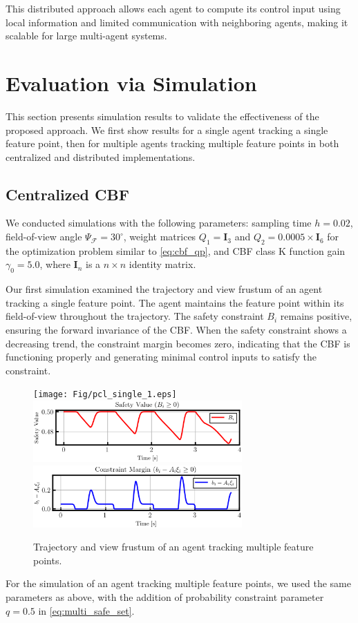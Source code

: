 \documentclass[fleqn,10pt,twocolumn]{SICE_FES25}
\theoremstyle{definition}
\theoremstyle{plain}
\begin{document}
This distributed approach allows each agent to compute its control input using local information and limited communication with neighboring agents, making it scalable for large multi-agent systems.

\section{Evaluation via Simulation}

This section presents simulation results to validate the effectiveness of the proposed approach. We first show results for a single agent tracking a single feature point, then for multiple agents tracking multiple feature points in both centralized and distributed implementations.

\subsection{Centralized CBF}

We conducted simulations with the following parameters: sampling time $h = 0.02$, field-of-view angle $\Psi_{\mathcal{F}} = 30^{\circ}$, weight matrices $Q_1 = {\mathbf{I}}_3$ and $Q_2 = 0.0005 \times {\mathbf{I}}_6$ for the optimization problem similar to \eqref{eq:cbf_qp}, and CBF class K function gain $\gamma_0 = 5.0$, where ${\mathbf{I}}_n$ is a $n \times n$ identity matrix.

Our first simulation examined the trajectory and view frustum of an agent tracking a single feature point. The agent maintains the feature point within its field-of-view throughout the trajectory. The safety constraint $B_i$ remains positive, ensuring the forward invariance of the CBF. When the safety constraint shows a decreasing trend, the constraint margin becomes zero, indicating that the CBF is functioning properly and generating minimal control inputs to satisfy the constraint.

\begin{figure}[h]
\begin{center}
\texttt{[image: Fig/pcl\_single\_1.eps]}\\
\includegraphics[width=8.0cm]{Fig/pcl_single_2.eps}\\
\includegraphics[width=8.0cm]{Fig/pcl_single_3.eps}
\caption{\label{fig:single_trajectory} Trajectory and view frustum of an agent tracking multiple feature points.}
\vspace{-4mm}
\end{center}
\end{figure}
For the simulation of an agent tracking multiple feature points, we used the same parameters as above, with the addition of probability constraint parameter $q = 0.5$ in \eqref{eq:multi_safe_set}.
\end{document}
